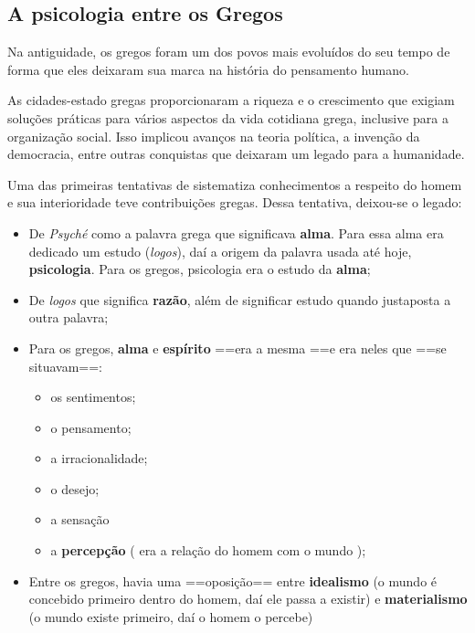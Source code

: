 \documentclass[
]{book}
\providecommand{\tightlist}{%
  \setlength{\itemsep}{0pt}\setlength{\parskip}{0pt}}
\theoremstyle{definition}
\theoremstyle{definition}
\theoremstyle{definition}
\theoremstyle{definition}
\theoremstyle{remark}
\begin{document}
\hypertarget{a-psicologia-entre-os-gregos}{%
\subsection{A psicologia entre os Gregos}\label{a-psicologia-entre-os-gregos}}

Na antiguidade, os gregos foram um dos povos mais evoluídos do seu tempo de forma que eles deixaram sua marca na história do pensamento humano.

As cidades-estado gregas proporcionaram a riqueza e o crescimento que exigiam soluções práticas para vários aspectos da vida cotidiana grega, inclusive para a organização social. Isso implicou avanços na teoria política, a invenção da democracia, entre outras conquistas que deixaram um legado para a humanidade.

Uma das primeiras tentativas de sistematiza conhecimentos a respeito do homem e sua interioridade teve contribuições gregas. Dessa tentativa, deixou-se o legado:

\begin{itemize}
\tightlist
\item
  De \emph{Psyché} como a palavra grega que significava \textbf{alma}. Para essa alma era dedicado um estudo (\emph{logos}), daí a origem da palavra usada até hoje, \textbf{psicologia}. Para os gregos, psicologia era o estudo da \textbf{alma};
\item
  De \emph{logos} que significa \textbf{razão}, além de significar estudo quando justaposta a outra palavra;
\item
  Para os gregos, \textbf{alma} e \textbf{espírito} ==era a mesma ==e era neles que ==se situavam==:

  \begin{itemize}
  \tightlist
  \item
    os sentimentos;
  \item
    o pensamento;
  \item
    a irracionalidade;
  \item
    o desejo;
  \item
    a sensação
  \item
    a \textbf{percepção} ( era a relação do homem com o mundo );
  \end{itemize}
\item
  Entre os gregos, havia uma ==oposição== entre \textbf{idealismo} (o mundo é concebido primeiro dentro do homem, daí ele passa a existir) e \textbf{materialismo} (o mundo existe primeiro, daí o homem o percebe)
\end{itemize}
\end{document}

